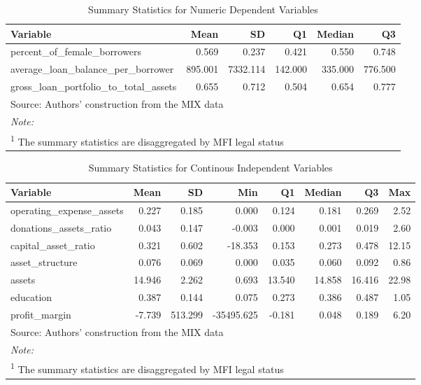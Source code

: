 \documentclass[a4paper, nobind]{templates/ociamthesis}
\begin{document}
\begin{table}

\caption{\label{tab:unnamed-chunk-69}Summary Statistics for Numeric Dependent Variables}
\centering
\fontsize{9}{11}\selectfont
\begin{tabular}[t]{lrrrrr}
\toprule
Variable & Mean & SD & Q1 & Median & Q3\\
\midrule
percent\_of\_female\_borrowers & 0.569 & 0.237 & 0.421 & 0.550 & 0.748\\
average\_loan\_balance\_per\_borrower & 895.001 & 7332.114 & 142.000 & 335.000 & 776.500\\
gross\_loan\_portfolio\_to\_total\_assets & 0.655 & 0.712 & 0.504 & 0.654 & 0.777\\
\bottomrule
\multicolumn{6}{l}{\rule{0pt}{1em}Source: Authors' construction from the MIX data}\\
\multicolumn{6}{l}{\rule{0pt}{1em}\textit{Note: }}\\
\multicolumn{6}{l}{\rule{0pt}{1em}\textsuperscript{1} The summary statistics are disaggregated by MFI legal status}\\
\end{tabular}
\end{table}

\begin{table}

\caption{\label{tab:unnamed-chunk-70}Summary Statistics for Continous Independent Variables}
\centering
\fontsize{10}{12}\selectfont
\begin{tabular}[t]{lrrrrrrr}
\toprule
Variable & Mean & SD & Min & Q1 & Median & Q3 & Max\\
\midrule
operating\_expense\_assets & 0.227 & 0.185 & 0.000 & 0.124 & 0.181 & 0.269 & 2.52\\
donations\_assets\_ratio & 0.043 & 0.147 & -0.003 & 0.000 & 0.001 & 0.019 & 2.60\\
capital\_asset\_ratio & 0.321 & 0.602 & -18.353 & 0.153 & 0.273 & 0.478 & 12.15\\
asset\_structure & 0.076 & 0.069 & 0.000 & 0.035 & 0.060 & 0.092 & 0.86\\
assets & 14.946 & 2.262 & 0.693 & 13.540 & 14.858 & 16.416 & 22.98\\
\addlinespace
education & 0.387 & 0.144 & 0.075 & 0.273 & 0.386 & 0.487 & 1.05\\
profit\_margin & -7.739 & 513.299 & -35495.625 & -0.181 & 0.048 & 0.189 & 6.20\\
\bottomrule
\multicolumn{8}{l}{\rule{0pt}{1em}Source: Authors' construction from the MIX data}\\
\multicolumn{8}{l}{\rule{0pt}{1em}\textit{Note: }}\\
\multicolumn{8}{l}{\rule{0pt}{1em}\textsuperscript{1} The summary statistics are disaggregated by MFI legal status}\\
\end{tabular}
\end{table}
\end{document}
